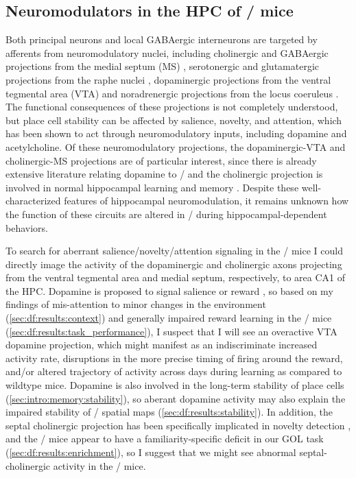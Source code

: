 \subsection{Neuromodulators in the \acl{HPC} of \df/ mice}
Both principal neurons and local GABAergic interneurons are targeted by afferents from neuromodulatory nuclei, including cholinergic and GABAergic projections from the medial septum (MS) \citep{Klausberger2008}, serotonergic and glutamatergic projections from the raphe nuclei \citep{Varga2009}, dopaminergic projections from the ventral tegmental area (VTA) \citep{Gasbarri1997} and noradrenergic projections from the locus coeruleus \citep{Foote1983}.
The functional consequences of these projections is not completely understood, but place cell stability can be affected by salience, novelty, and attention, which has been shown to act through neuromodulatory inputs, including dopamine and acetylcholine.
Of these neuromodulatory projections, the dopaminergic-VTA and cholinergic-MS projections are of particular interest, since there is already extensive literature relating dopamine to \scz/ \citep{Davis1991} and the cholinergic projection is involved in normal hippocampal learning and memory \citep{Parent2004}.
Despite these well-characterized features of hippocampal neuromodulation, it remains unknown how the function of these circuits are altered in \scz/ during hippocampal-dependent behaviors.

To search for aberrant salience/novelty/attention signaling in the \df/ mice I could directly image the activity of the dopaminergic and cholinergic axons projecting from the ventral tegmental area and medial septum, respectively, to area CA1 of the \ac{HPC}.
Dopamine is proposed to signal salience or reward \citep{Berridge1998}, so based on my findings of mis-attention to minor changes in the environment (\autoref{sec:df:results:context}) and generally impaired reward learning in the \df/ mice (\autoref{sec:df:results:task_performance}), I suspect that I will see an overactive VTA dopamine projection, which might manifest as an indiscriminate increased activity rate, disruptions in the more precise timing of firing around the reward, and/or altered trajectory of activity across days during learning as compared to wildtype mice.
Dopamine is also involved in the long-term stability of place cells (\autoref{sec:intro:memory:stability}), so aberant dopamine activity may also explain the impaired stability of \df/ spatial maps (\autoref{sec:df:results:stability}).
In addition, the septal cholinergic projection has been specifically implicated in novelty detection \citep{Jeewajee2008, Barry2012c}, and the \df/ mice appear to have a familiarity-specific deficit in our \ac{GOL} task (\autoref{sec:df:results:enrichment}), so I suggest that we might see abnormal septal-cholinergic activity in the \df/ mice.


